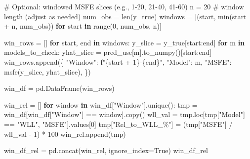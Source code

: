\documentclass[
  letterpaper,
  DIV=11,
  numbers=noendperiod]{scrartcl}
\newenvironment{Shaded}{\begin{snugshade}}{\end{snugshade}}
\newcommand{\BuiltInTok}[1]{\textcolor[rgb]{0.00,0.23,0.31}{#1}}
\newcommand{\CommentTok}[1]{\textcolor[rgb]{0.37,0.37,0.37}{#1}}
\newcommand{\ControlFlowTok}[1]{\textcolor[rgb]{0.00,0.23,0.31}{\textbf{#1}}}
\newcommand{\DecValTok}[1]{\textcolor[rgb]{0.68,0.00,0.00}{#1}}
\newcommand{\KeywordTok}[1]{\textcolor[rgb]{0.00,0.23,0.31}{\textbf{#1}}}
\newcommand{\NormalTok}[1]{\textcolor[rgb]{0.00,0.23,0.31}{#1}}
\newcommand{\OperatorTok}[1]{\textcolor[rgb]{0.37,0.37,0.37}{#1}}
\newcommand{\SpecialCharTok}[1]{\textcolor[rgb]{0.37,0.37,0.37}{#1}}
\newcommand{\SpecialStringTok}[1]{\textcolor[rgb]{0.13,0.47,0.30}{#1}}
\newcommand{\StringTok}[1]{\textcolor[rgb]{0.13,0.47,0.30}{#1}}
\newcommand{\VariableTok}[1]{\textcolor[rgb]{0.07,0.07,0.07}{#1}}
\begin{document}
\begin{Shaded}
\begin{Highlighting}[]
\CommentTok{\# Optional: windowed MSFE slices (e.g., 1{-}20, 21{-}40, 41{-}60)}
\NormalTok{n }\OperatorTok{=} \DecValTok{20}  \CommentTok{\# window length (adjust as needed)}
\NormalTok{num\_obs }\OperatorTok{=} \BuiltInTok{len}\NormalTok{(y\_true)}
\NormalTok{windows }\OperatorTok{=}\NormalTok{ [(start, }\BuiltInTok{min}\NormalTok{(start }\OperatorTok{+}\NormalTok{ n, num\_obs)) }\ControlFlowTok{for}\NormalTok{ start }\KeywordTok{in} \BuiltInTok{range}\NormalTok{(}\DecValTok{0}\NormalTok{, num\_obs, n)]}

\NormalTok{win\_rows }\OperatorTok{=}\NormalTok{ []}
\ControlFlowTok{for}\NormalTok{ start, end }\KeywordTok{in}\NormalTok{ windows:}
\NormalTok{    y\_slice }\OperatorTok{=}\NormalTok{ y\_true[start:end]}
    \ControlFlowTok{for}\NormalTok{ m }\KeywordTok{in}\NormalTok{ models\_to\_check:}
\NormalTok{        yhat\_slice }\OperatorTok{=}\NormalTok{ pred\_use[m].to\_numpy()[start:end]}
\NormalTok{        win\_rows.append(\{}
            \StringTok{"Window"}\NormalTok{: }\SpecialStringTok{f"}\SpecialCharTok{\{}\NormalTok{start }\OperatorTok{+} \DecValTok{1}\SpecialCharTok{\}}\SpecialStringTok{{-}}\SpecialCharTok{\{}\NormalTok{end}\SpecialCharTok{\}}\SpecialStringTok{"}\NormalTok{,}
            \StringTok{"Model"}\NormalTok{: m,}
            \StringTok{"MSFE"}\NormalTok{: msfe(y\_slice, yhat\_slice),}
\NormalTok{        \})}

\NormalTok{win\_df }\OperatorTok{=}\NormalTok{ pd.DataFrame(win\_rows)}

\NormalTok{win\_rel }\OperatorTok{=}\NormalTok{ []}
\ControlFlowTok{for}\NormalTok{ window }\KeywordTok{in}\NormalTok{ win\_df[}\StringTok{"Window"}\NormalTok{].unique():}
\NormalTok{    tmp }\OperatorTok{=}\NormalTok{ win\_df[win\_df[}\StringTok{"Window"}\NormalTok{] }\OperatorTok{==}\NormalTok{ window].copy()}
\NormalTok{    wll\_val }\OperatorTok{=}\NormalTok{ tmp.loc[tmp[}\StringTok{"Model"}\NormalTok{] }\OperatorTok{==} \StringTok{"WLL"}\NormalTok{, }\StringTok{"MSFE"}\NormalTok{].values[}\DecValTok{0}\NormalTok{]}
\NormalTok{    tmp[}\StringTok{"Rel\_to\_WLL\_\%"}\NormalTok{] }\OperatorTok{=}\NormalTok{ (tmp[}\StringTok{"MSFE"}\NormalTok{] }\OperatorTok{/}\NormalTok{ wll\_val }\OperatorTok{{-}} \DecValTok{1}\NormalTok{) }\OperatorTok{*} \DecValTok{100}
\NormalTok{    win\_rel.append(tmp)}

\NormalTok{win\_df\_rel }\OperatorTok{=}\NormalTok{ pd.concat(win\_rel, ignore\_index}\OperatorTok{=}\VariableTok{True}\NormalTok{)}
\NormalTok{win\_df\_rel}
\end{Highlighting}
\end{Shaded}
\end{document}

